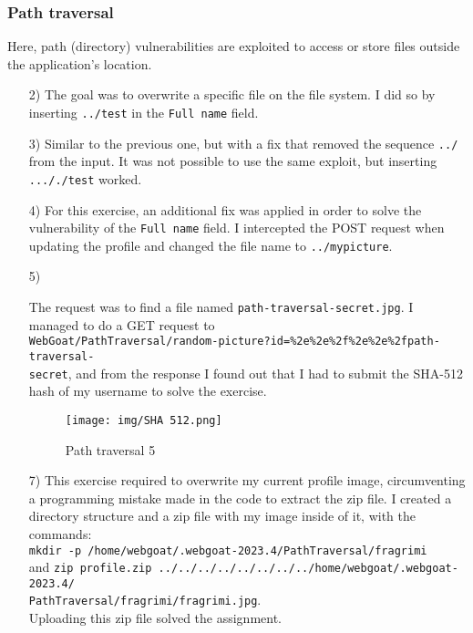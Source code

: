 \documentclass{article}
\begin{document}
\subsubsection{Path traversal}
Here, path (directory) vulnerabilities are exploited to access or store files outside the application's location.
\begin{itemize}
    \item[2)] {The goal was to overwrite a specific file on the file system.
    I did so by inserting \texttt{../test} in the \texttt{Full name} field.}
    
    \item[3)] {Similar to the previous one, but with a fix that removed the sequence \texttt{../} from the input.
    It was not possible to use the same exploit, but inserting \texttt{..././test} worked.}
    
    \item[4)] {For this exercise, an additional fix was applied in order to solve the vulnerability of the \texttt{Full name} field.
    I intercepted the POST request when updating the profile and changed the file name to \texttt{../mypicture}.}
    
    \item[5)] {The request was to find a file named \texttt{path-traversal-secret.jpg}.
    I managed to do a GET request to\\\texttt{WebGoat/PathTraversal/random-picture?id=\%2e\%2e\%2f\%2e\%2e\%2fpath-traversal-\\secret}, and from the response I found out that I had to submit the SHA-512 hash of my username to solve the exercise.
    \begin{figure}[H]
        \centering
        \texttt{[image: img/SHA 512.png]}
        \caption{Path traversal 5}
        \label{fig:SHA-512}
    \end{figure}
    }
    
    \item[7)] {This exercise required to overwrite my current profile image, circumventing a programming mistake made in the code to extract the zip file.
    I created a directory structure and a zip file with my image inside of it, with the commands:\\
    \texttt{mkdir -p /home/webgoat/.webgoat-2023.4/PathTraversal/fragrimi}\\and \texttt{zip profile.zip ../../../../../../../../home/webgoat/.webgoat-2023.4/\\PathTraversal/fragrimi/fragrimi.jpg}.\\
    Uploading this zip file solved the assignment.}
\end{itemize}
\end{document}
